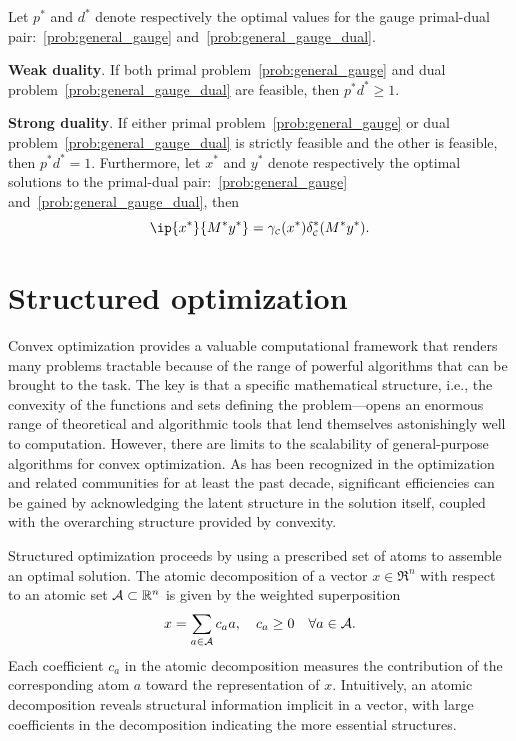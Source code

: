 \begin{theorem} 
    Let $p^*$ and $d^*$ denote respectively the optimal values for the gauge primal-dual pair:~\eqref{prob:general_gauge} and~\eqref{prob:general_gauge_dual}. 
    \item \textbf{Weak duality}. If both primal problem~\eqref{prob:general_gauge} and dual problem~\eqref{prob:general_gauge_dual} are feasible, then $p^* d^* \geq 1$. 
    \item \textbf{Strong duality}. If either primal problem~\eqref{prob:general_gauge} or dual problem~\eqref{prob:general_gauge_dual} is strictly feasible and the other is feasible, then $p^* d^* = 1$. Furthermore, let $x^*$ and $y^*$ denote respectively the optimal solutions to the primal-dual pair:~\eqref{prob:general_gauge} and~\eqref{prob:general_gauge_dual}, then 
    \[\ip{x^*}{M^*y^*} = \gauge\Cs(x^*)\delta\Cs^*(M^*y^*).\]
    
\end{theorem}

\section{Structured optimization} \label{sec:1-3}

Convex optimization provides a valuable computational framework that renders many problems tractable because of the range of powerful algorithms that can be brought to the task. The key is that a specific mathematical structure, i.e., the convexity of the functions and sets defining the problem—opens an enormous range of theoretical and algorithmic tools that lend themselves astonishingly well to computation. However, there are limits to the scalability of general-purpose algorithms for convex optimization. As has been recognized in the optimization and related communities for at least the past decade, significant efficiencies can be gained by acknowledging the latent structure in the solution itself, coupled with the overarching structure provided by convexity.

Structured optimization proceeds by using a prescribed set of atoms to assemble an optimal solution. The atomic decomposition of a vector $x\in\Re^n$ with respect to an atomic set
$\mathcal{A}\subset\mathbb{R}^n$ is given by the weighted superposition
\begin{equation} \label{eq:atomic-decomp}
  x = \sum_{a\in\mathcal{A}} c_a a, \quad c_a\ge0 \quad \forall a\in\mathcal{A}.
\end{equation}
Each coefficient $c_a$ in the atomic decomposition measures the contribution of
the corresponding atom $a$ toward the representation of $x$. Intuitively, an
atomic decomposition reveals structural information implicit in a vector, with
large coefficients in the decomposition indicating the more essential
structures.

